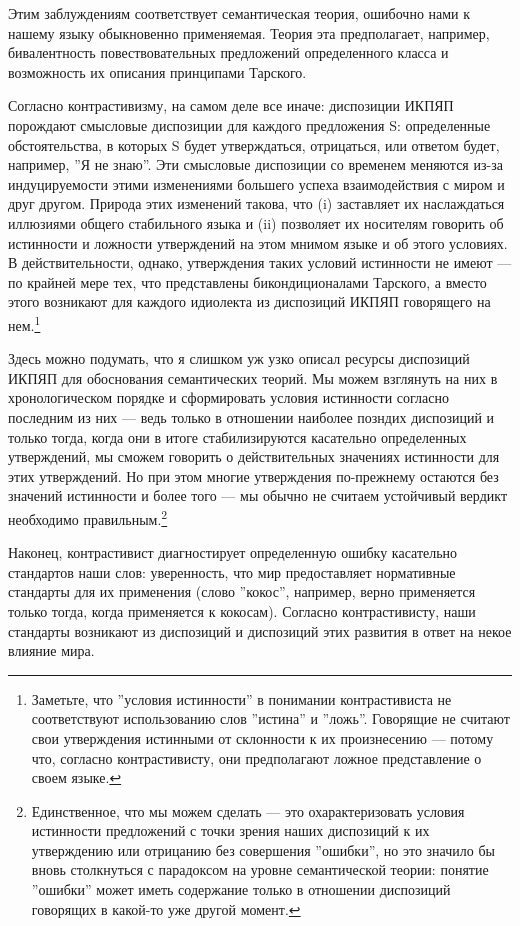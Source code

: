 \documentclass[11pt]{book}
\begin{document}
Этим заблуждениям соответствует семантическая теория, ошибочно нами к нашему языку обыкновенно применяемая. Теория эта предполагает, например, бивалентность повествовательных предложений определенного класса и возможность их описания принципами Тарского.

Согласно контрастивизму, на самом деле все иначе: диспозиции ИКПЯП порождают смысловые диспозиции для каждого предложения S: определенные обстоятельства, в которых S будет утверждаться, отрицаться, или ответом будет, например,  ''Я не знаю''. Эти смысловые диспозиции со временем меняются из-за индуцируемости этими изменениями большего успеха взаимодействия с миром и друг другом. Природа этих изменений такова, что (i) заставляет их наслаждаться иллюзиями общего стабильного языка и (ii) позволяет их носителям говорить об истинности и ложности утверждений на этом мнимом языке и об этого условиях. В действительности, однако, утверждения таких условий истинности не имеют --- по крайней мере тех, что представлены бикондиционалами Тарского, а вместо этого возникают для каждого идиолекта из диспозиций ИКПЯП говорящего на нем.\footnote{Заметьте, что ''условия истинности'' в понимании контрастивиста не соответствуют использованию слов ''истина'' и ''ложь''. Говорящие не считают свои утверждения истинными от склонности к их произнесению --- потому что, согласно контрастивисту, они предполагают ложное представление о своем языке.}

Здесь можно подумать, что я слишком уж узко описал ресурсы диспозиций ИКПЯП для обоснования семантических теорий. Мы можем взглянуть на них в хронологическом порядке и сформировать условия истинности согласно последним из них --- ведь только в отношении наиболее позндих диспозиций и только тогда, когда они в итоге стабилизируются касательно определенных утверждений, мы сможем говорить о действительных значениях истинности для этих утверждений. Но при этом многие утверждения по-прежнему остаются без значений истинности и более того --- мы обычно не считаем устойчивый вердикт необходимо правильным.\footnote{Единственное, что мы можем сделать --- это охарактеризовать условия истинности предложений с точки зрения наших диспозиций к их утверждению или отрицанию без совершения ''ошибки'', но это значило бы вновь столкнуться с парадоксом на уровне семантической теории: понятие ''ошибки'' может иметь содержание только в отношении диспозиций говорящих в какой-то уже другой момент.}

Наконец, контрастивист диагностирует определенную ошибку касательно стандартов наши слов: уверенность, что мир предоставляет нормативные стандарты для их применения (слово ''кокос'', например, верно применяется только тогда, когда применяется к кокосам). Согласно контрастивисту, наши стандарты возникают из диспозиций и диспозиций этих развития в ответ на некое влияние мира.
\end{document}
